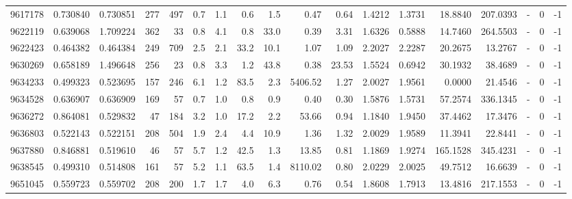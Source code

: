 \begin{tabular}{rrrrrrrrrrrrrrrlrr}
   9617178 & 0.730840 &   0.730851 &  277 &  497 &      0.7 &      1.1 &     0.6 &      1.5 &       0.47 &        0.64 &  1.4212 &  1.3731 &   18.8840 &  207.0393 &             - &        0 &         -1 \\
   9622119 & 0.639068 &   1.709224 &  362 &   33 &      0.8 &      4.1 &     0.8 &     33.0 &       0.39 &        3.31 &  1.6326 &  0.5888 &   14.7460 &  264.5503 &             - &        0 &         -1 \\
   9622423 & 0.464382 &   0.464384 &  249 &  709 &      2.5 &      2.1 &    33.2 &     10.1 &       1.07 &        1.09 &  2.2027 &  2.2287 &   20.2675 &   13.2767 &             - &        0 &         -1 \\
   9630269 & 0.658189 &   1.496648 &  256 &   23 &      0.8 &      3.3 &     1.2 &     43.8 &       0.38 &       23.53 &  1.5524 &  0.6942 &   30.1932 &   38.4689 &             - &        0 &         -1 \\
   9634233 & 0.499323 &   0.523695 &  157 &  246 &      6.1 &      1.2 &    83.5 &      2.3 &    5406.52 &        1.27 &  2.0027 &  1.9561 &    0.0000 &   21.4546 &             - &        0 &         -1 \\
   9634528 & 0.636907 &   0.636909 &  169 &   57 &      0.7 &      1.0 &     0.8 &      0.9 &       0.40 &        0.30 &  1.5876 &  1.5731 &   57.2574 &  336.1345 &             - &        0 &         -1 \\
   9636272 & 0.864081 &   0.529832 &   47 &  184 &      3.2 &      1.0 &    17.2 &      2.2 &      53.66 &        0.94 &  1.1840 &  1.9450 &   37.4462 &   17.3476 &             - &        0 &         -1 \\
   9636803 & 0.522143 &   0.522151 &  208 &  504 &      1.9 &      2.4 &     4.4 &     10.9 &       1.36 &        1.32 &  2.0029 &  1.9589 &   11.3941 &   22.8441 &             - &        0 &         -1 \\
   9637880 & 0.846881 &   0.519610 &   46 &   57 &      5.7 &      1.2 &    42.5 &      1.3 &      13.85 &        0.81 &  1.1869 &  1.9274 &  165.1528 &  345.4231 &             - &        0 &         -1 \\
   9638545 & 0.499310 &   0.514808 &  161 &   57 &      5.2 &      1.1 &    63.5 &      1.4 &    8110.02 &        0.80 &  2.0229 &  2.0025 &   49.7512 &   16.6639 &             - &        0 &         -1 \\
   9651045 & 0.559723 &   0.559702 &  208 &  200 &      1.7 &      1.7 &     4.0 &      6.3 &       0.76 &        0.54 &  1.8608 &  1.7913 &   13.4816 &  217.1553 &             - &        0 &         -1 \\

\end{tabular}
